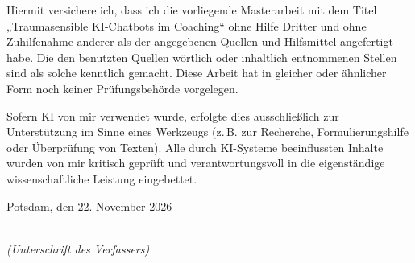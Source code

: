 \newpage
\thispagestyle{empty}

\vspace*{2cm}

\noindent
Hiermit versichere ich, dass ich die vorliegende Masterarbeit mit dem Titel „Traumasensible KI-Chatbots im Coaching“ ohne Hilfe Dritter und ohne Zuhilfenahme anderer als der angegebenen Quellen und Hilfsmittel angefertigt habe. Die den benutzten Quellen wörtlich oder inhaltlich entnommenen Stellen sind als solche kenntlich gemacht. Diese Arbeit hat in gleicher oder ähnlicher Form noch keiner Prüfungsbehörde vorgelegen.

\medskip
\noindent
Sofern KI von mir verwendet wurde, erfolgte dies ausschließlich zur Unterstützung im Sinne eines Werkzeugs (z.\,B. zur Recherche, Formulierungshilfe oder Überprüfung von Texten). Alle durch KI-Systeme beeinflussten Inhalte wurden von mir kritisch geprüft und verantwortungsvoll in die eigenständige wissenschaftliche Leistung eingebettet.

\vspace{2cm}

\noindent
Potsdam, den 22. November 2026

\vspace{3cm}

\noindent
\hfill
\begin{minipage}{0.45\textwidth}
  \centering
  \dotfill\\
  \textit{(Unterschrift des Verfassers)}
\end{minipage}
